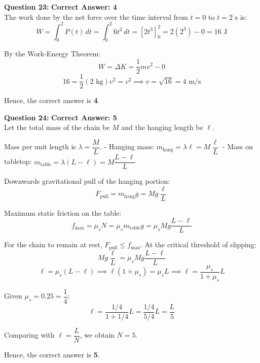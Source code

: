 \documentclass[11pt,a4paper]{article}
\begin{document}
\begin{tcolorbox}[solbox]
\textbf{\textcolor{primaryDark}{Question 23:}} \hfill \textbf{\textcolor{l1Green}{Correct Answer: 4}}\\
\vspace{4pt}
The work done by the net force over the time interval from $t = 0$ to $t = 2\text{ s}$ is:
$$W = \int_{0}^{2} P(t)\, dt = \int_{0}^{2} 6t^2\, dt = \left[ 2t^3 \right]_{0}^{2} = 2(2^3) - 0 = 16\text{ J}$$

By the Work-Energy Theorem:
$$W = \Delta K = \frac{1}{2}m v^2 - 0$$
$$16 = \frac{1}{2}(2\text{ kg}) v^2 = v^2 \implies v = \sqrt{16} = 4\text{ m/s}$$

Hence, the correct answer is \textbf{4}.
\end{tcolorbox}

\begin{tcolorbox}[solbox]
\textbf{\textcolor{primaryDark}{Question 24:}} \hfill \textbf{\textcolor{l1Green}{Correct Answer: 5}}\\
\vspace{4pt}
Let the total mass of the chain be $M$ and the hanging length be $\ell$.

Mass per unit length is $\lambda = \dfrac{M}{L}$.
- Hanging mass: $m_{\text{hang}} = \lambda \ell = M\dfrac{\ell}{L}$
- Mass on tabletop: $m_{\text{table}} = \lambda(L - \ell) = M\dfrac{L - \ell}{L}$

Downwards gravitational pull of the hanging portion:
$$F_{\text{pull}} = m_{\text{hang}} g = M g \frac{\ell}{L}$$

Maximum static friction on the table:
$$f_{\max} = \mu_s N = \mu_s m_{\text{table}} g = \mu_s M g \frac{L - \ell}{L}$$

For the chain to remain at rest, $F_{\text{pull}} \le f_{\max}$. At the critical threshold of slipping:
$$M g \frac{\ell}{L} = \mu_s M g \frac{L - \ell}{L}$$
$$\ell = \mu_s(L - \ell) \implies \ell(1 + \mu_s) = \mu_s L \implies \ell = \frac{\mu_s}{1 + \mu_s} L$$

Given $\mu_s = 0.25 = \dfrac{1}{4}$:
$$\ell = \frac{1/4}{1 + 1/4} L = \frac{1/4}{5/4} L = \frac{L}{5}$$

Comparing with $\ell = \dfrac{L}{N}$, we obtain $N = 5$.

Hence, the correct answer is \textbf{5}.
\end{tcolorbox}
\end{document}
